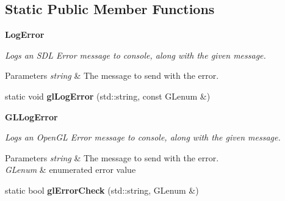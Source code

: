 \subsection*{Static Public Member Functions}
\begin{Indent}{\bf Log\+Error}\par
{\em Logs an S\+D\+L Error message to console, along with the given message.


\begin{DoxyParams}{Parameters}
{\em string} & The message to send with the error. \\
\hline
\end{DoxyParams}
}\begin{DoxyCompactItemize}
\item 
\hypertarget{classngl_1_1gl_application_aaa7b9d9157935913e056ef08e5c18cf7}{}static void {\bfseries gl\+Log\+Error} (std\+::string, const G\+Lenum \&)\label{classngl_1_1gl_application_aaa7b9d9157935913e056ef08e5c18cf7}

\end{DoxyCompactItemize}
\end{Indent}
\begin{Indent}{\bf G\+L\+Log\+Error}\par
{\em Logs an Open\+G\+L Error message to console, along with the given message.


\begin{DoxyParams}{Parameters}
{\em string} & The message to send with the error. \\
\hline
{\em G\+Lenum} & enumerated error value \\
\hline
\end{DoxyParams}
}\begin{DoxyCompactItemize}
\item 
\hypertarget{classngl_1_1gl_application_a4628e65d4950b32baaab4c9e5d96467c}{}static bool {\bfseries gl\+Error\+Check} (std\+::string, G\+Lenum \&)\label{classngl_1_1gl_application_a4628e65d4950b32baaab4c9e5d96467c}

\end{DoxyCompactItemize}
\end{Indent}
